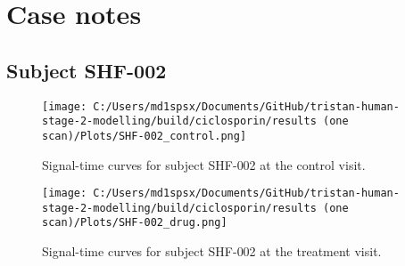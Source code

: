 \documentclass{epflreport}%
\begin{document}
\section{Case notes}%
\label{sec:Casenotes}%

%
\subsection{Subject SHF{-}002}%
\label{subsec:SubjectSHF{-}002}%

%


\begin{figure}[h!]%
\centering%
\texttt{[image: C:/Users/md1spsx/Documents/GitHub/tristan-human-stage-2-modelling/build/ciclosporin/results (one scan)/Plots/SHF-002\_control.png]}%
\caption{Signal{-}time curves for subject SHF{-}002 at the control visit.}%
\end{figure}

%


\begin{figure}[h!]%
\centering%
\texttt{[image: C:/Users/md1spsx/Documents/GitHub/tristan-human-stage-2-modelling/build/ciclosporin/results (one scan)/Plots/SHF-002\_drug.png]}%
\caption{Signal{-}time curves for subject SHF{-}002 at the treatment visit.}%
\end{figure}
\end{document}
